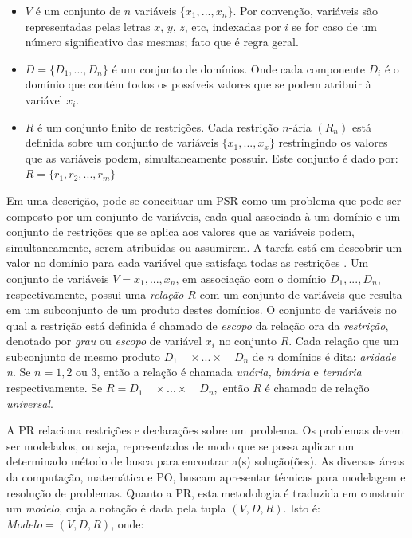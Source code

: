 \begin{itemize}

 \item $V$ é um conjunto de $n$ variáveis $\lbrace x_{1}, ..., x_{n} \rbrace$. Por convenção, variáveis  são representadas pelas letras $x$, $y$, $z$, etc, indexadas por $i$ se for caso de um número
 significativo das mesmas; fato que é regra geral.
 

 \item $D = \lbrace D_{1}, ..., D_{n} \rbrace$ é um conjunto de domínios. Onde cada componente $D_{i}$ é o domínio que contém todos os possíveis valores que se podem atribuir à variável $x_{i}$.


 \item $R$ é um conjunto finito de restrições. Cada restrição $n$-ária $(R_{n})$ está definida sobre um conjunto de variáveis $\lbrace x_{1}, ..., x_{x} \rbrace$ restringindo os valores que as variáveis podem, simultaneamente possuir. Este conjunto é dado por: $R = \{ r_1, r_2, ..., r_m \}$

\end{itemize}


Em uma descrição, pode-se conceituar um PSR como um problema que pode ser composto por um conjunto de variáveis, cada qual associada à um domínio e um conjunto de restrições que se aplica aos valores que as variáveis podem, simultaneamente, serem atribu\'idas ou assumirem. A tarefa está em descobrir um valor no domínio para cada variável que satisfaça todas as restrições \cite{tsang93}. Um conjunto de variáveis $ V = {x_{1},...,x_{n}} $, em associação com o domínio $D_{1},...,D_{n}$, respectivamente, possui uma \textit{relação $R$} com um conjunto de variáveis que resulta em um subconjunto de um produto destes domínios. O conjunto de variáveis no qual a restrição está definida é chamado de \textit{escopo} da relação 
ora da \textit{restriç\~ao}, denotado por  \textit{grau} ou  \textit{escopo} de vari\'avel $x_i$ no conjunto   $R$. Cada relação que um subconjunto de mesmo produto $D_{1} \quad  \times ... \times \quad D_{n}$ de $n$ domínios é dita: \textit{aridade n}. Se $n  = 1, 2 $ ou $3$, então a relação é chamada \textit{unária, binária} e \textit{ternária} respectivamente. Se $R = D_{1}\quad \times ... \times \quad D_{n}, $ ent\~ao $R$ é chamado de relação \textit{universal}. 


A PR  relaciona restrições  e declarações sobre um problema. Os problemas devem ser modelados,  ou seja, representados de modo que se possa aplicar um determinado método de busca para encontrar a(s)  solução(ões). As diversas áreas da computação, matemática e PO, buscam  apresentar  técnicas   para
 modelagem e resolução de problemas. Quanto
a PR, esta metodologia é traduzida em construir um {\em modelo}, cuja a notação é 
dada pela tupla $(V, D, R)$. Isto é: $Modelo = (V, D, R)$, onde:

